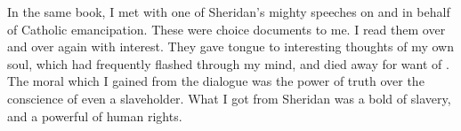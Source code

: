 \documentclass{fiche}
\begin{document}
\begin{texte}
In the same book, I met with one of Sheridan's mighty speeches on and in behalf of Catholic
emancipation. These were choice documents to me. I read them over and over again with
 interest. They gave tongue to interesting thoughts of
my own soul, which had frequently flashed through my mind, and died away for want of
. The moral which I gained from the dialogue
was the power of truth over the conscience of even a slaveholder. What I got from Sheridan
was a bold  of slavery, and a powerful
 of human rights.
\end{texte}

\end{document}
